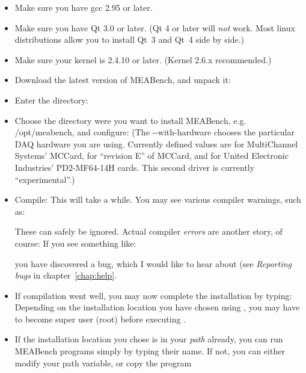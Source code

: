 \documentclass[12pt,oneside]{book}
\def\meabench{{MEABench}\xspace}
\def\filename#1{{\sf #1}\xspace}
\begin{document}
\begin{itemize}
\item Make sure you have gcc 2.95 or later.
\item Make sure you have Qt 3.0 or later. (Qt 4 or later will \emph{not} work. Most linux distributions allow you to install Qt~3 and Qt~4 side by side.)
\item Make sure your kernel is 2.4.10 or later. (Kernel 2.6.x recommended.)
\item Download the latest version of \meabench, and unpack it:
\item Enter the directory:
\item Choose the directory were you want to install \meabench, e.g.
  \filename{/opt/meabench}, and configure:
(The \filename{-{}-with-hardware} chooses the particular DAQ hardware
you are using. Currently defined values are  for MultiChannel
Systems' MCCard,  for ``revision E'' of MCCard, and  for United Electronic Industries'
PD2-MF64-14H cards. This second driver is currently ``experimental''.)
\item Compile:
This will take a while. You may see various compiler warnings, such
as: 
\begin{quotation}\end{quotation}
These can safely be ignored. Actual compiler {\it errors} are another story,
of course: If you see something like:
\begin{quotation}\end{quotation}
you have discovered a bug, which I would like to hear about (see
\emph{Reporting bugs} in chapter~\ref{chap:help}.
\item If compilation went well, you may now complete the installation
by typing:
Depending on the installation location you have chosen using
, you may have to become super user (root)
before executing .
\item If the installation location you chose is in your {\it path}
already, you can run \meabench programs simply by typing their name. 
If not, you can either modify your path variable, or copy the program

\end{itemize}
\end{document}
